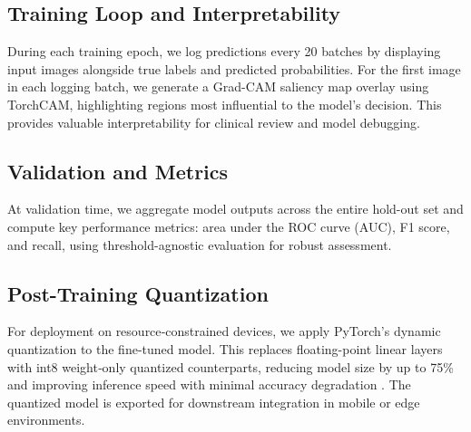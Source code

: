 \subsection{Training Loop and Interpretability}
During each training epoch, we log predictions every 20 batches by displaying input images alongside true labels and predicted probabilities. For the first image in each logging batch, we generate a Grad-CAM saliency map overlay using TorchCAM, highlighting regions most influential to the model’s decision. This provides valuable interpretability for clinical review and model debugging.

\subsection{Validation and Metrics}
At validation time, we aggregate model outputs across the entire hold-out set and compute key performance metrics: area under the ROC curve (AUC), F1 score, and recall, using threshold-agnostic evaluation for robust assessment.

\subsection{Post-Training Quantization}
For deployment on resource‐constrained devices, we apply PyTorch’s dynamic quantization to the fine-tuned model. This replaces floating-point linear layers with int8 weight‐only quantized counterparts, reducing model size by up to 75\% and improving inference speed with minimal accuracy degradation . The quantized model is exported for downstream integration in mobile or edge environments.


